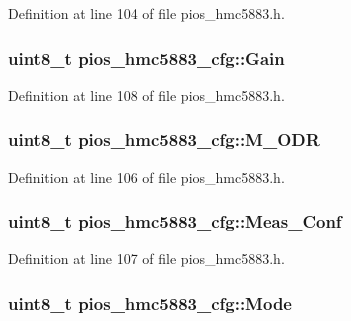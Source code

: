 \-Definition at line 104 of file pios\-\_\-hmc5883.\-h.

\hypertarget{structpios__hmc5883__cfg_a82fb6708784acace10b4f5c5a9c8e23e}{
\subsubsection[{\-Gain}]{\setlength{\rightskip}{0pt plus 5cm}uint8\-\_\-t {\bf pios\-\_\-hmc5883\-\_\-cfg\-::\-Gain}}}\label{structpios__hmc5883__cfg_a82fb6708784acace10b4f5c5a9c8e23e}


\-Definition at line 108 of file pios\-\_\-hmc5883.\-h.

\hypertarget{structpios__hmc5883__cfg_a236d1b5f3c3858bc2edd263841c37ace}{
\subsubsection[{\-M\-\_\-\-O\-D\-R}]{\setlength{\rightskip}{0pt plus 5cm}uint8\-\_\-t {\bf pios\-\_\-hmc5883\-\_\-cfg\-::\-M\-\_\-\-O\-D\-R}}}\label{structpios__hmc5883__cfg_a236d1b5f3c3858bc2edd263841c37ace}


\-Definition at line 106 of file pios\-\_\-hmc5883.\-h.

\hypertarget{structpios__hmc5883__cfg_ab04e80aeca39b18767e5e6cbe1f39654}{
\subsubsection[{\-Meas\-\_\-\-Conf}]{\setlength{\rightskip}{0pt plus 5cm}uint8\-\_\-t {\bf pios\-\_\-hmc5883\-\_\-cfg\-::\-Meas\-\_\-\-Conf}}}\label{structpios__hmc5883__cfg_ab04e80aeca39b18767e5e6cbe1f39654}


\-Definition at line 107 of file pios\-\_\-hmc5883.\-h.

\hypertarget{structpios__hmc5883__cfg_a0d50b5428ef5db686bdbd44127425f28}{
\subsubsection[{\-Mode}]{\setlength{\rightskip}{0pt plus 5cm}uint8\-\_\-t {\bf pios\-\_\-hmc5883\-\_\-cfg\-::\-Mode}}}\label{structpios__hmc5883__cfg_a0d50b5428ef5db686bdbd44127425f28}


